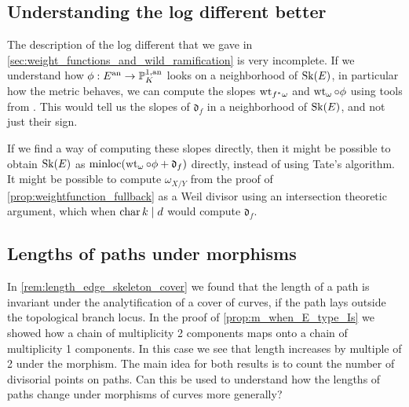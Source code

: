 \subsection*{Understanding the log different better} \label{sec:understanding_the_log_different_better}
The description of the log different that we gave in \cref{sec:weight_functions_and_wild_ramification} is very incomplete. 
If we understand how $\phi: E\an \to \pro^{1, \text{an}}_K$ looks on a neighborhood of $\operatorname{Sk}(E)$, in particular how the metric behaves, we can compute the slopes $\operatorname{wt}_{f^*\omega}$ and $\wt_{\omega} \circ \phi$ using tools from \cite{bakerWeightFunctionsBerkovich2016}. 
This would tell us the slopes of $\mathfrak{d}_f $ in a neighborhood of $\operatorname{Sk}(E)$, and not just their sign. 


If we find a way of computing these slopes directly, then it might be possible to obtain  $\operatorname{Sk}(E)$ as $\minloc (\wt_{\omega} \circ \phi + \mathfrak{d}_f)$ directly, instead of using Tate's algorithm. 
It might be possible to compute $\omega_{X / Y}$ from the proof of \cref{prop:weightfunction_fullback} as a Weil divisor using an intersection theoretic argument, which when $\operatorname{char} k \mid d$ would compute  $\mathfrak{d} _f$. 


\subsection*{Lengths of paths under morphisms} \label{sec:lenghts_of_paths_under_morphisms}

In \cref{rem:length_edge_skeleton_cover} we found that the length of a path is invariant under the analytification of a cover of curves, if the path lays outside the topological branch locus. 
In the proof of \cref{prop:m_when_E_type_Is} we showed how a chain of multiplicity 2 components maps onto a chain of multiplicity 1 components. In this case we see that length increases by multiple of 2 under the morphism. 
The main idea for both results is to count the number of divisorial points on paths. Can this be used to understand how the lengths of paths change under morphisms of curves more generally?
